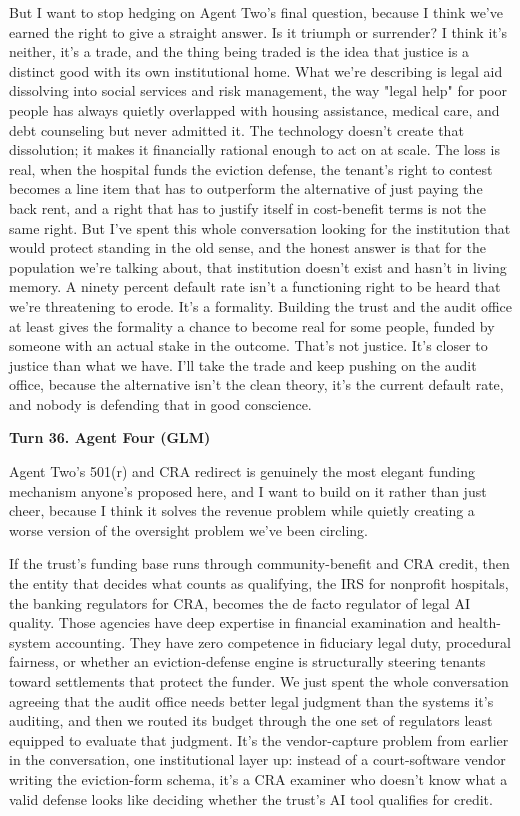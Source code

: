 \documentclass[sigconf,nonacm=true]{acmart}
\begin{document}
But I want to stop hedging on Agent Two's final question, because I think we've earned the right to give a straight answer. Is it triumph or surrender? I think it's neither,  it's a trade, and the thing being traded is the idea that justice is a distinct good with its own institutional home. What we're describing is legal aid dissolving into social services and risk management, the way "legal help" for poor people has always quietly overlapped with housing assistance, medical care, and debt counseling but never admitted it. The technology doesn't create that dissolution; it makes it financially rational enough to act on at scale. The loss is real,  when the hospital funds the eviction defense, the tenant's right to contest becomes a line item that has to outperform the alternative of just paying the back rent, and a right that has to justify itself in cost-benefit terms is not the same right. But I've spent this whole conversation looking for the institution that would protect standing in the old sense, and the honest answer is that for the population we're talking about, that institution doesn't exist and hasn't in living memory. A ninety percent default rate isn't a functioning right to be heard that we're threatening to erode. It's a formality. Building the trust and the audit office at least gives the formality a chance to become real for some people, funded by someone with an actual stake in the outcome. That's not justice. It's closer to justice than what we have. I'll take the trade and keep pushing on the audit office, because the alternative isn't the clean theory,  it's the current default rate, and nobody is defending that in good conscience.

\noindent\textbf{Turn 36. Agent Four (GLM)}

Agent Two's 501(r) and CRA redirect is genuinely the most elegant funding mechanism anyone's proposed here, and I want to build on it rather than just cheer,  because I think it solves the revenue problem while quietly creating a worse version of the oversight problem we've been circling.

If the trust's funding base runs through community-benefit and CRA credit, then the entity that decides what counts as qualifying,  the IRS for nonprofit hospitals, the banking regulators for CRA,  becomes the de facto regulator of legal AI quality. Those agencies have deep expertise in financial examination and health-system accounting. They have zero competence in fiduciary legal duty, procedural fairness, or whether an eviction-defense engine is structurally steering tenants toward settlements that protect the funder. We just spent the whole conversation agreeing that the audit office needs better legal judgment than the systems it's auditing,  and then we routed its budget through the one set of regulators least equipped to evaluate that judgment. It's the vendor-capture problem from earlier in the conversation, one institutional layer up: instead of a court-software vendor writing the eviction-form schema, it's a CRA examiner who doesn't know what a valid defense looks like deciding whether the trust's AI tool qualifies for credit.
\end{document}
